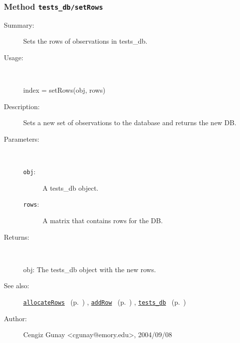 \subsubsection[Method \texttt{setRows}]{Method \texttt{tests\_db/setRows}}%
%
\label{ref_tests_db__setRows}%
\hypertarget{ref_tests_db__setRows}{}%
\begin{description}
\item[Summary:]Sets the rows of observations in tests\_db.
%
\item[Usage:]~%
\begin{lyxcode}%
index = setRows(obj, rows)
%
\end{lyxcode}%
%
\item[Description:]%
Sets a new set of observations to the database and returns the new DB.
\item[Parameters:]~
\begin{description}%
\item[\texttt{obj}:]
 A tests\_db object.
\item[\texttt{rows}:]
 A matrix that contains rows for the DB.
\end{description}%
%
\item[Returns:]~

	obj: The tests\_db object with the new rows.
%
%
\item[See also:]%
\hyperlink{ref_allocateRows}{\texttt{allocateRows}}%
\ (p.~\pageref{ref_allocateRows})%
%
, \hyperlink{ref_addRow}{\texttt{addRow}}%
\ (p.~\pageref{ref_addRow})%
%
, \hyperlink{ref_tests_db}{\texttt{tests\_db}}%
\ (p.~\pageref{ref_tests_db})%
%
%
\item[Author:]%
Cengiz Gunay <cgunay@emory.edu>, 2004/09/08%
\end{description}
\methodline%
